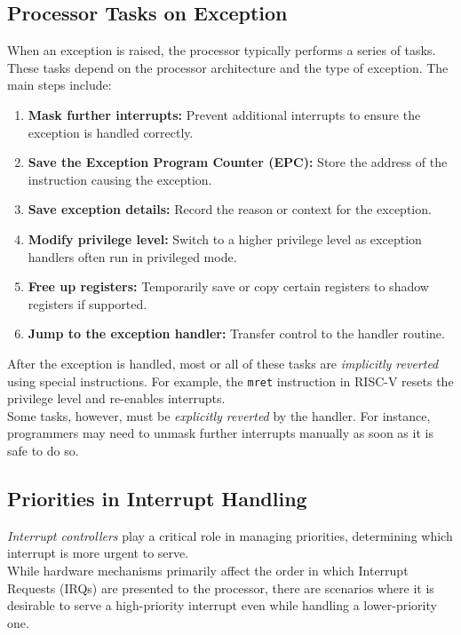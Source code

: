 \subsection{Processor Tasks on Exception}
When an exception is raised, the processor typically performs a series of tasks. These tasks depend on the processor architecture and the type of exception. The main steps include:

\begin{enumerate}
    \item \textbf{Mask further interrupts:} Prevent additional interrupts to ensure the exception is handled correctly.
    \item \textbf{Save the Exception Program Counter (EPC):} Store the address of the instruction causing the exception.
    \item \textbf{Save exception details:} Record the reason or context for the exception.
    \item \textbf{Modify privilege level:} Switch to a higher privilege level as exception handlers often run in privileged mode.
    \item \textbf{Free up registers:} Temporarily save or copy certain registers to shadow registers if supported.
    \item \textbf{Jump to the exception handler:} Transfer control to the handler routine.
\end{enumerate}

\noindent After the exception is handled, most or all of these tasks are \textit{implicitly reverted} using special instructions. For example, the \texttt{mret} instruction in RISC-V resets the privilege level and re-enables interrupts. \\
\vspace{5px}
Some tasks, however, must be \textit{explicitly reverted} by the handler. For instance, programmers may need to unmask further interrupts manually as soon as it is safe to do so.

\subsection{Priorities in Interrupt Handling}

\textit{Interrupt controllers} play a critical role in managing priorities, determining which interrupt is more urgent to serve. \\

While hardware mechanisms primarily affect the order in which Interrupt Requests (IRQs) are presented to the processor, there are scenarios where it is desirable to serve a high-priority interrupt even while handling a lower-priority one.

